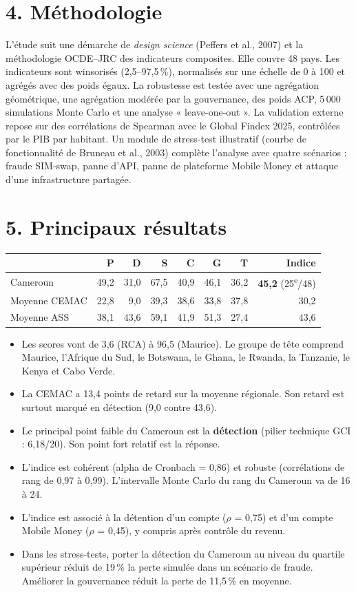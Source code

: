 \documentclass[11pt,a4paper]{article}
\begin{document}
\section*{4. Méthodologie}
L'étude suit une démarche de \emph{design science} (Peffers et al., 2007) et la méthodologie OCDE--JRC des indicateurs composites. Elle couvre 48 pays. Les indicateurs sont winsorisés (2,5--97,5\,\%), normalisés sur une échelle de 0 à 100 et agrégés avec des poids égaux. La robustesse est testée avec une agrégation géométrique, une agrégation modérée par la gouvernance, des poids ACP, 5\,000 simulations Monte Carlo et une analyse « leave-one-out ». La validation externe repose sur des corrélations de Spearman avec le Global Findex 2025, contrôlées par le PIB par habitant. Un module de stress-test illustratif (courbe de fonctionnalité de Bruneau et al., 2003) complète l'analyse avec quatre scénarios : fraude SIM-swap, panne d'API, panne de plateforme Mobile Money et attaque d'une infrastructure partagée.

\section*{5. Principaux résultats}
\begin{center}\begin{tabular}{lrrrrrrr}\toprule
 & P & D & S & C & G & T & Indice\\\midrule
Cameroun & 49,2 & 31,0 & 67,5 & 40,9 & 46,1 & 36,2 & \textbf{45,2} (25\textsuperscript{e}/48)\\
Moyenne CEMAC & 22,8 & 9,0 & 39,3 & 38,6 & 33,8 & 37,8 & 30,2\\
Moyenne ASS & 38,1 & 43,6 & 59,1 & 41,9 & 51,3 & 27,4 & 43,6\\\bottomrule\end{tabular}\end{center}
\begin{itemize}
\item Les scores vont de 3,6 (RCA) à 96,5 (Maurice). Le groupe de tête comprend Maurice, l'Afrique du Sud, le Botswana, le Ghana, le Rwanda, la Tanzanie, le Kenya et Cabo Verde.
\item La CEMAC a 13,4 points de retard sur la moyenne régionale. Son retard est surtout marqué en détection (9,0 contre 43,6).
\item Le principal point faible du Cameroun est la \textbf{détection} (pilier technique GCI : 6,18/20). Son point fort relatif est la réponse.
\item L'indice est cohérent (alpha de Cronbach = 0,86) et robuste (corrélations de rang de 0,97 à 0,99). L'intervalle Monte Carlo du rang du Cameroun va de 16 à 24.
\item L'indice est associé à la détention d'un compte ($\rho$ = 0,75) et d'un compte Mobile Money ($\rho$ = 0,45), y compris après contrôle du revenu.
\item Dans les stress-tests, porter la détection du Cameroun au niveau du quartile supérieur réduit de 19\,\% la perte simulée dans un scénario de fraude. Améliorer la gouvernance réduit la perte de 11,5\,\% en moyenne.
\end{itemize}
\end{document}
